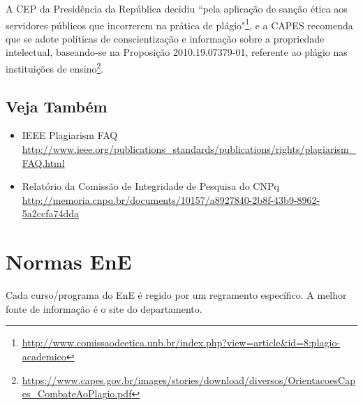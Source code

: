 A \acrfull{CEP} da Presidência da República decidiu  ``pela
aplicação de sanção ética aos servidores públicos que incorrerem na prática de
plágio"\footnote{\url{http://www.comissaodeetica.unb.br/index.php?view=article&id=8:plagio-academico}},
e a \acrfull{CAPES} recomenda que se adote políticas de conscientização e informação
sobre a propriedade intelectual, baseando-se na Proposição 2010.19.07379-01,
referente ao plágio nas instituições de ensino\footnote{\url{https://www.capes.gov.br/images/stories/download/diversos/OrientacoesCapes_CombateAoPlagio.pdf}}.


\subsection{Veja Também}
\begin{itemize}
	\item IEEE Plagiarism FAQ
		\\\url{http://www.ieee.org/publications_standards/publications/rights/plagiarism_FAQ.html}
	\item Relatório da Comissão de Integridade de Pesquisa do CNPq
		\\\url{http://memoria.cnpq.br/documents/10157/a8927840-2b8f-43b9-8962-5a2ccfa74dda}
\end{itemize}

\section{Normas EnE}
Cada curso/programa do \acrlong{EnE} é regido por um regramento específico. A melhor fonte de 
informação é o site do departamento.